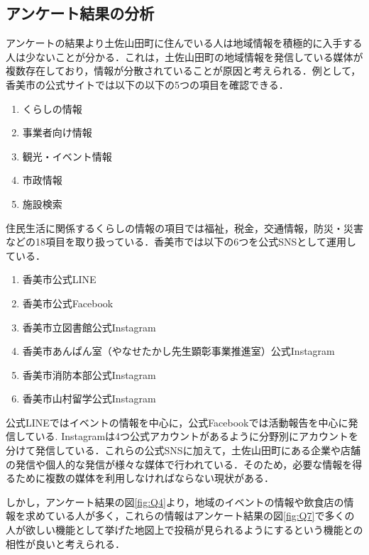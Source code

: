 \subsection{アンケート結果の分析}
アンケートの結果より土佐山田町に住んでいる人は地域情報を積極的に入手する人は少ないことが分かる．これは，土佐山田町の地域情報を発信している媒体が複数存在しており，情報が分散されていることが原因と考えられる．例として，香美市の公式サイト\cite{label1}では以下の以下の5つの項目を確認できる．
\begin{enumerate}
    \renewcommand{\labelenumi}{・}
    \item くらしの情報
    \item 事業者向け情報
    \item 観光・イベント情報
    \item 市政情報
    \item 施設検索
\end{enumerate}
住民生活に関係するくらしの情報の項目では福祉，税金，交通情報，防災・災害などの18項目を取り扱っている．香美市では以下の6つを公式SNSとして運用している\cite{label2}．
\begin{enumerate}
    \renewcommand{\labelenumi}{・}
    \item 香美市公式LINE
    \item 香美市公式Facebook
    \item 香美市立図書館公式Instagram
    \item 香美市あんぱん室（やなせたかし先生顕彰事業推進室）公式Instagram
    \item 香美市消防本部公式Instagram
    \item 香美市山村留学公式Instagram
\end{enumerate}
公式LINEではイベントの情報を中心に，公式Facebookでは活動報告を中心に発信している.
Instagramは4つ公式アカウントがあるように分野別にアカウントを分けて発信している．これらの公式SNSに加えて，土佐山田町にある企業や店舗の発信や個人的な発信が様々な媒体で行われている．そのため，必要な情報を得るために複数の媒体を利用しなければならない現状がある．

しかし，アンケート結果の図\ref{fig:Q4}より，地域のイベントの情報や飲食店の情報を求めている人が多く，これらの情報はアンケート結果の図\ref{fig:Q7}で多くの人が欲しい機能として挙げた地図上で投稿が見られるようにするという機能との相性が良いと考えられる．
